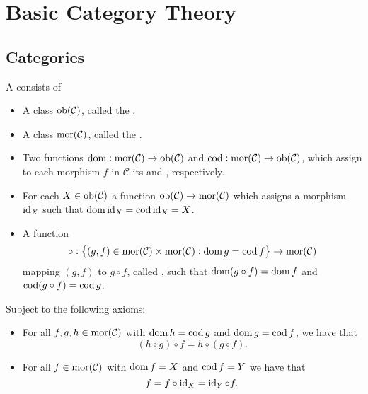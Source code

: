\chapter{Basic Category Theory}
\section*{Categories}

\begin{definition}[Category]
	A  consists of 
	\begin{itemize}[leftmargin = *]
		\item A class $\operatorname{ob}(\mathcal{C})$, called the .
		\item A class $\operatorname{mor}(\mathcal{C})$, called the .
		\item Two functions $\operatorname{dom} : \operatorname{mor}(\mathcal{C}) \to \operatorname{ob}(\mathcal{C})$ and $\operatorname{cod} : \operatorname{mor}(\mathcal{C}) \to \operatorname{ob}(\mathcal{C})$, which assign to each morphism $f$ in $\mathcal{C}$ its  and , respectively.
		\item For each $X \in \operatorname{ob}(\mathcal{C})$ a function $\operatorname{ob}(\mathcal{C}) \to \operatorname{mor}(\mathcal{C})$ which assigns a morphism $\operatorname{id}_X$ such that $\operatorname{dom} \operatorname{id}_X = \operatorname{cod} \operatorname{id}_X = X$.
		\item A function 
			\begin{equation}
				\circ : \cbr{(g,f) \in \mor(\mathcal{C}) \times \mor(\mathcal{C}) : \dom g = \cod f} \to \mor(\mathcal{C}) 
			\end{equation}
			mapping $(g,f)$ to $g \circ f$, called , such that $\operatorname{dom}(g \circ f) = \operatorname{dom} f$ and $\operatorname{cod}(g \circ f) = \operatorname{cod} g$.
	\end{itemize}
	Subject to the following axioms:
	\begin{itemize}[leftmargin = *]
		\item {} For all $f,g,h \in \operatorname{mor}(\mathcal{C})$ with $\operatorname{dom} h = \operatorname{cod} g$ and $\operatorname{dom} g = \operatorname{cod} f$, we have that
			\begin{equation}
				(h \circ g) \circ f = h \circ (g \circ f).
			\end{equation}
		\item {} For all $f \in \operatorname{mor}(\mathcal{C})$ with $\operatorname{dom} f = X$ and $\operatorname{cod} f = Y$ we have that
			\begin{equation}
				f = f \circ \operatorname{id}_X = \operatorname{id}_Y \circ f.
			\end{equation}
	\end{itemize}
\end{definition}

